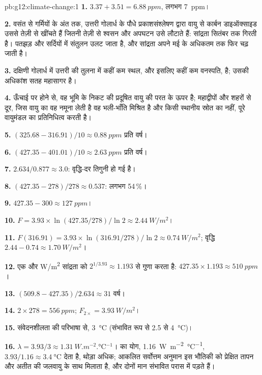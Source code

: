 \begin{solution}{pb:g12:climate-change:1}
\textbf{1.} $3.37 + 3.51 = \qty{6.88}{ppm}$, लगभग \qty{7}{ppm}।

\textbf{2.} वसंत से गर्मियों के अंत तक, उत्तरी
गोलार्ध के पौधे प्रकाशसंश्लेषण द्वारा वायु से कार्बन डाइऑक्साइड उससे तेज़ी से खींचते हैं
जितनी तेज़ी से श्वसन और अपघटन उसे लौटाते हैं: सांद्रता सितंबर तक गिरती है।
पतझड़ और सर्दियों में संतुलन उलट जाता है, और सांद्रता अपने मई के अधिकतम तक
फिर चढ़ जाती है।

\textbf{3.} दक्षिणी गोलार्ध में उत्तरी की तुलना में कहीं कम स्थल, और इसलिए कहीं कम
वनस्पति, है; उसकी अधिकांश सतह महासागर है।

\textbf{4.} ऊँचाई पर होने से, वह भूमि के निकट की प्रदूषित वायु की परत के ऊपर
है; महाद्वीपों और शहरों से दूर, जिस वायु का वह नमूना लेती है वह भली-भाँति मिश्रित है और
किसी स्थानीय स्रोत का नहीं, पूरे वायुमंडल का प्रतिनिधित्व करती है।

\textbf{5.} $(325.68 - 316.91)/10 \approx \qty{0.88}{ppm}$ प्रति वर्ष।

\textbf{6.} $(427.35 - 401.01)/10 \approx \qty{2.63}{ppm}$ प्रति वर्ष।

\textbf{7.} $2.634/0.877 \approx 3.0$: वृद्धि-दर तिगुनी हो गई है।

\textbf{8.} $(427.35 - 278)/278 \approx 0.537$: लगभग 54\,\%।

\textbf{9.} $427.35 - 300 \approx \qty{127}{ppm}$।

\textbf{10.} $F = 3.93 \times \ln(427.35/278)/\ln 2 \approx
\qty{2.44}{W/m^2}$।

\textbf{11.} $F(316.91) = 3.93 \times \ln(316.91/278)/\ln 2 \approx
\qty{0.74}{W/m^2}$; वृद्धि $2.44 - 0.74 \approx \qty{1.70}{W/m^2}$।

\textbf{12.} एक और \unit{W/m^2} सांद्रता को
$2^{1/3.93} \approx 1.193$ से गुणा करता है: $427.35 \times 1.193 \approx \qty{510}{ppm}$।

\textbf{13.} $(509.8 - 427.35)/2.634 \approx 31$ वर्ष।

\textbf{14.} $2 \times 278 = \qty{556}{ppm}$;  $F_{2\times} =
\qty{3.93}{W/m^2}$।

\textbf{15.} संवेदनशीलता की परिभाषा से, \qty{3}{\degreeCelsius}
(संभावित रूप से 2.5 से \qty{4}{\degreeCelsius})।

\textbf{16.} $\lambda = 3.93/3 \approx \qty{1.31}{W.m^{-2}.\degreeCelsius^{-1}}$।
 का योग, \qty{1.16}{W.m^{-2}.\degreeCelsius^{-1}},
$3.93/1.16 \approx \qty{3.4}{\degreeCelsius}$ देता है, थोड़ा अधिक; आकलित
सर्वोत्तम अनुमान इस भौतिकी को प्रेक्षित तापन और अतीत की जलवायु के साथ
मिलाता है, और दोनों मान संभावित परास में पड़ते हैं।


\end{solution}
